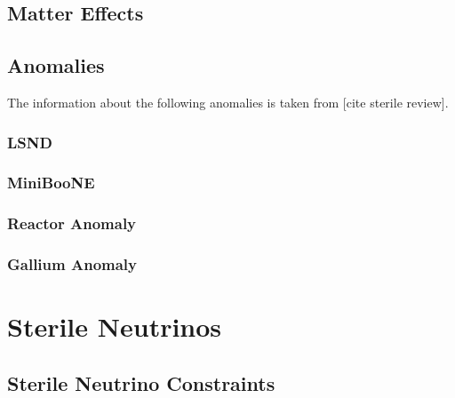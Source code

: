 \documentclass[a4paper,12pt,numbered]{article}
\begin{document}
\subsection{Matter Effects}


\subsection{Anomalies}


The information about the following anomalies is taken from [cite sterile review].

\subsubsection{LSND}
\subsubsection{MiniBooNE}
\subsubsection{Reactor Anomaly}
\subsubsection{Gallium Anomaly}
\section{Sterile Neutrinos}

\subsection{Sterile Neutrino Constraints}




\end{document}
